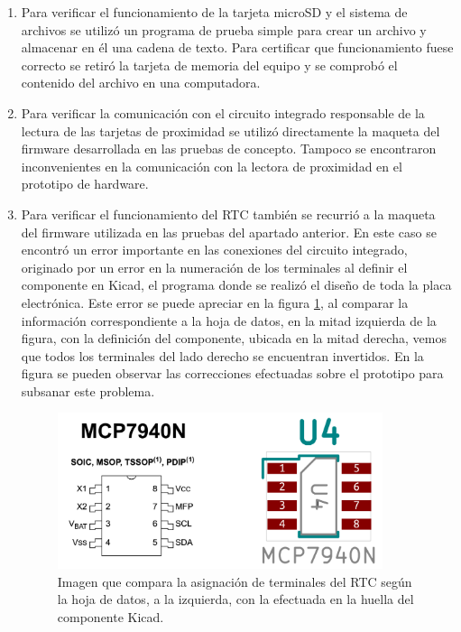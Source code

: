 \begin{enumerate}
	\item Para verificar el funcionamiento de la tarjeta microSD y el sistema de archivos se utilizó un programa de prueba simple para crear un archivo y almacenar en él una cadena de texto. Para certificar que funcionamiento fuese correcto se retiró la tarjeta de memoria del equipo y se comprobó el contenido del archivo en una computadora.
	
	\item Para verificar la comunicación con el circuito integrado responsable de la lectura de las tarjetas de proximidad se utilizó directamente la maqueta del firmware desarrollada en las pruebas de concepto. Tampoco se encontraron inconvenientes en la comunicación con la lectora de proximidad en el prototipo de hardware.
	
	\item Para verificar el funcionamiento del RTC también se recurrió a la maqueta del firmware utilizada en las pruebas del apartado anterior. En este caso se encontró un error importante en las conexiones del circuito integrado, originado por un error en la numeración de los terminales al definir el componente en Kicad, el programa donde se realizó el diseño de toda la placa electrónica. Este error se puede apreciar en la figura \ref{fig:ErrorRTC}, al comparar la información correspondiente a la hoja de datos\cite{noauthor_mcp7940n_nodate}, en la mitad izquierda de la figura, con la definición del componente, ubicada en la mitad derecha, vemos que todos los terminales del lado derecho se encuentran invertidos. En la figura \label{fig:ErroresPrototipo} se pueden observar las correcciones efectuadas sobre el prototipo para subsanar este problema.
	
\begin{figure}[ht]
	\centering
	\includegraphics[width=0.9\textwidth]{Figures/ErrorHuella.png}
	\caption[Error en la asignacion de terminales del RTC]{Imagen que compara la asignación de terminales del RTC según la hoja de datos, a la izquierda, con la efectuada en la huella del componente Kicad.}
	\label{fig:ErrorRTC}
\end{figure}


\end{enumerate}
